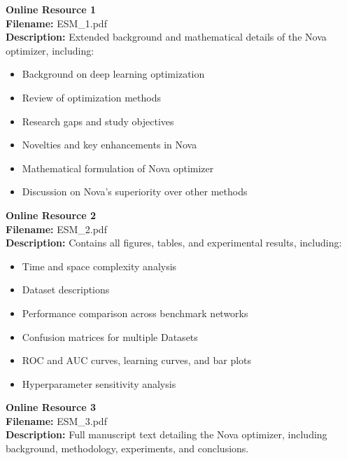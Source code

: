 \documentclass[10pt,twocolumn]{article}
\begin{document}
\noindent\textbf{Online Resource 1} \\  
\textbf{Filename:} ESM\_1.pdf \\  
\textbf{Description:} Extended background and mathematical details of the Nova optimizer, including:  
\begin{itemize}
    \item Background on deep learning optimization  
    \item Review of optimization methods  
    \item Research gaps and study objectives  
    \item Novelties and key enhancements in Nova  
    \item Mathematical formulation of Nova optimizer  
    \item Discussion on Nova’s superiority over other methods  
\end{itemize}

\vspace{0.5em}

\noindent\textbf{Online Resource 2} \\  
\textbf{Filename:} ESM\_2.pdf \\  
\textbf{Description:} Contains all figures, tables, and experimental results, including:  
\begin{itemize}
    \item Time and space complexity analysis  
    \item Dataset descriptions  
    \item Performance comparison across benchmark networks  
    \item Confusion matrices for multiple Datasets  
    \item ROC and AUC curves, learning curves, and bar plots  
    \item Hyperparameter sensitivity analysis  
\end{itemize}

\vspace{0.5em}

\noindent\textbf{Online Resource 3} \\  
\textbf{Filename:} ESM\_3.pdf \\  
\textbf{Description:} Full manuscript text detailing the Nova optimizer, including background, methodology, experiments, and conclusions.
\end{document}

